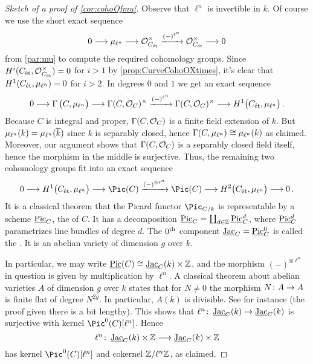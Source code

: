 \begin{proof}[Sketch of a proof of \cref{cor:cohoOfmu}]
	Observe that $\ell^n$ is invertible in $k$. Of course we use the short exact sequence
	\begin{equation*}
		0\morphism \mu_{\ell^n}\morphism \Oo_{C_\et}^\times\xrightarrow{(-)^{\ell^n}}\Oo_{C_\et}^\times\morphism 0
	\end{equation*}
	from \cref{par:mu} to compute the required cohomology groups. Since $H^i(C_{\mathrm{\acute{e}t}},\mathcal{O}_{C_{\mathrm{\acute{e}t}}}^\times)=0$ for $i>1$ by \cref{prop:CurveCohoOXtimes}, it's clear that $H^1(C_{\mathrm{\acute{e}t}},\mu_{\ell^n})=0$ for $i>2$. In degrees $0$ and $1$ we get an exact sequence 
	\begin{equation*}
		0\morphism \Global\big(C,\mu_{\ell^n}\big)\morphism\Global(C,\Oo_C)^\times\xrightarrow{(-)^{\ell^n}} \Global(C,\Oo_C)^\times \morphism H^1\big(C_\et,\mu_{\ell^n}\big)\,.
	\end{equation*}
	Because $C$ is integral and proper, $\operatorname{\Gamma}(C,\mathcal{O}_C)$ is a finite field extension of $k$. But $\mu_{\ell^n}(k)=\mu_{\ell^n}(\ov{k})$ since $k$ is separably closed, hence $\operatorname{\Gamma}(C,\mu_{\ell^n})\cong \mu_{\ell^n}(k)$ as claimed. Moreover, our argument shows that $\operatorname{\Gamma}(C,\mathcal{O}_C)$ is a separably closed field itself, hence the morphism in the middle is surjective. Thus, the remaining two cohomology groups fit into an exact sequence
	\begin{equation*}
		0\morphism H^1\big(C_\et,\mu_{\ell^n}\big)\morphism \Pic(C)\xrightarrow{(-)^{\otimes \ell^n}}\Pic(C)\morphism H^2\big(C_\et,\mu_{\ell^n}\big)\morphism 0\,.
	\end{equation*}
	It is a classical theorem that the Picard functor $\Pic_{C/k}$ is representable by a scheme $\operatorname{\underline{\smash{\mathrm{Pic}}}}_C$, the  of $C$. It has a decomposition $\operatorname{\underline{\smash{\mathrm{Pic}}}}_C=\coprod_{d\in \mathbb{Z}}\operatorname{\underline{\smash{\mathrm{Pic}}}}^d_C$, where $\operatorname{\underline{\smash{\mathrm{Pic}}}}^d_C$ parametrizes line bundles of degree $d$. The $0^{\text{th}}$ component $\operatorname{\underline{\smash{\mathrm{Jac}}}}_C= \operatorname{\underline{\smash{\mathrm{Pic}}}}^0_C$ is called the . It is an abelian variety of dimension $g$ over $k$.
	
	In particular, we may write $\operatorname{\underline{\smash{\mathrm{Pic}}}}(C)\cong \operatorname{\underline{\smash{\mathrm{Jac}}}}_C(k)\times \mathbb{Z}$, and the morphism $(-)^{\otimes \ell^n}$ in question is given by multiplication by $\ell^n$. A classical theorem about abelian varieties $A$ of dimension $g$ over $k$ states that for $N\neq 0$ the morphism $N\colon A\morphism A$ is finite flat of degree $N^{2g}$. In particular, $A(k)$ is divisible. See \cite[Theorem~10]{jacobians} for instance (the proof given there is a bit lengthy). This shows that $\ell^n\colon \JAC_C(k)\morphism\JAC_C(k)$ is surjective with kernel $\Pic^0(C)[\ell^n]$. Hence 
	\begin{equation*}
		\ell^n\colon \JAC_C(k)\times \IZ\morphism\JAC_C(k)\times \IZ
	\end{equation*}
	has kernel $\Pic^0(C)[\ell^n]$ and cokernel $\mathbb{Z}/\ell^n\mathbb{Z}$, as claimed.
	

\end{proof}
